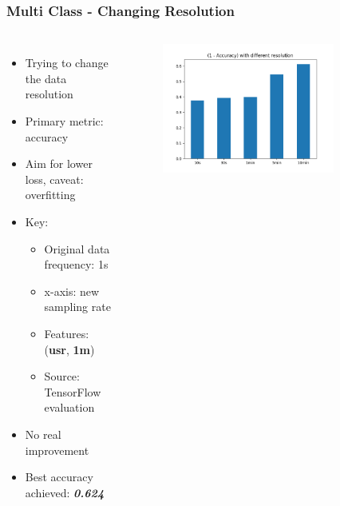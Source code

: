 \documentclass[aspectratio=169,11pt,hyperref={colorlinks=true}]{beamer}
\begin{document}
\begin{frame}
    \frametitle{Multi Class - Changing Resolution}
    \begin{columns}
        \begin{itemize}
            \item{Trying to change the data resolution}
            \item{Primary metric: accuracy}
            \item{Aim for lower loss, caveat: overfitting}
            \item{Key:}
            \begin{itemize}
              \item{Original data frequency: 1s}
              \item{x-axis: new sampling rate}
              \item{Features: (\textbf{usr}, \textbf{1m})}
              \item{Source: TensorFlow evaluation}
            \end{itemize}
            \item{No real improvement}
            \item{Best accuracy achieved: \emph{\textbf{0.624}}}
        \end{itemize}
        \begin{center}
        \begin{figure}
          \includegraphics[width=0.8\textwidth,height=0.4\textheight]{graphs/accuracy_by_sampling-node_provider_all.png}
        \end{figure}
        \begin{figure}

\end{figure}
\end{center}
\end{columns}
\end{frame}
\end{document}
